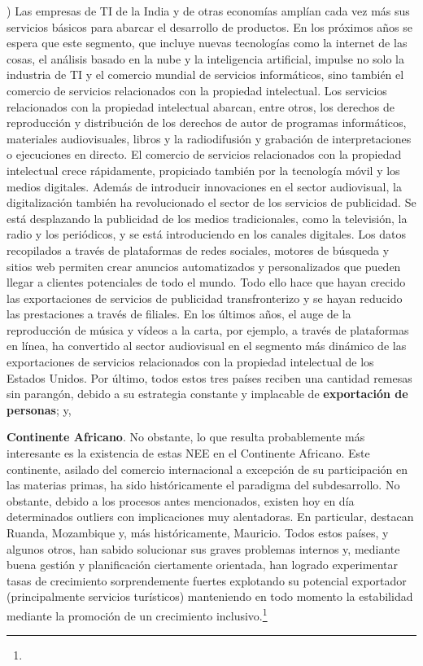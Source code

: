 \documentclass[10pt,a4paper]{article}
\newcounter{alphaitem}
\newenvironment{la}
      {\begin{list}{\alph{alphaitem})}{%
          \usecounter{alphaitem}%
          \setlength{\leftmargin}{1cm}%
          \setlength{\parskip}{3pt}%
          \setlength{\itemsep}{0pt}%
          \setlength{\parsep}{0pt}%
      }}
      {\end{list}}
\begin{document}
\begin{la}
{        Las empresas de TI de la India y de otras economías amplían cada vez más sus servicios básicos para abarcar el desarrollo de productos. En los próximos años se espera que este segmento, que incluye nuevas tecnologías como la internet de las cosas, el análisis basado en la nube y la inteligencia artificial, impulse no solo la industria de TI y el comercio mundial de servicios informáticos, sino también el comercio de servicios relacionados con la propiedad intelectual. Los servicios relacionados con la propiedad intelectual abarcan, entre otros, los derechos de reproducción y distribución de los derechos de autor de programas informáticos, materiales audiovisuales, libros y la radiodifusión y grabación de interpretaciones o ejecuciones en directo. El comercio de servicios relacionados con la propiedad intelectual crece rápidamente, propiciado también por la tecnología móvil y los medios digitales. Además de introducir innovaciones en el sector audiovisual, la digitalización también ha revolucionado el sector de los servicios de publicidad. Se está desplazando la publicidad de los medios tradicionales, como la televisión, la radio y los periódicos, y se está introduciendo en los canales digitales. Los datos recopilados a través de plataformas de redes sociales, motores de búsqueda y sitios web permiten crear anuncios automatizados y personalizados que pueden llegar a clientes potenciales de todo el mundo. Todo ello hace que hayan crecido las exportaciones de servicios de publicidad transfronterizo y se hayan reducido las prestaciones a través de filiales. En los últimos años, el auge de la reproducción de música y vídeos a la carta, por ejemplo, a través de plataformas en línea, ha convertido al sector audiovisual en el segmento más dinámico de las exportaciones de servicios relacionados con la propiedad intelectual de los Estados Unidos.
    } Por último, todos estos tres países reciben una cantidad remesas sin parangón, debido a su estrategia constante y implacable de \textbf{exportación de personas}; y,
    \item \textbf{Continente Africano}. No obstante, lo que resulta probablemente más interesante es la existencia de estas NEE en el Continente Africano. Este continente, asilado del comercio internacional a excepción de su participación en las materias primas, ha sido históricamente el paradigma del subdesarrollo. No obstante, debido a los procesos antes mencionados, existen hoy en día determinados outliers con implicaciones muy alentadoras. En particular, destacan Ruanda, Mozambique y, más históricamente, Mauricio. Todos estos países, y algunos otros, han sabido solucionar sus graves problemas internos y, mediante buena gestión y planificación ciertamente orientada, han logrado experimentar tasas de crecimiento sorprendemente fuertes explotando su potencial exportador (principalmente servicios turísticos) manteniendo en todo momento la estabilidad mediante la promoción de un crecimiento inclusivo.\footnote{%
}
\end{la}
\end{document}
